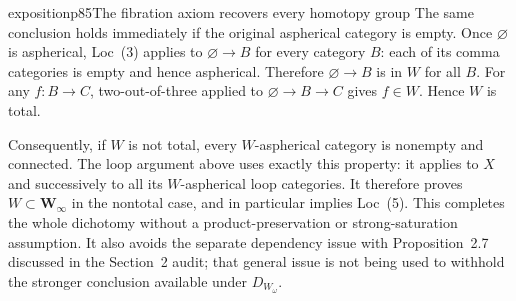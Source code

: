 \begin{dcomment}{exposition}{p85}{The fibration axiom recovers every homotopy group}
The same conclusion holds immediately if the original aspherical category is empty. Once $\varnothing$ is aspherical, Loc~(3) applies to $\varnothing\to B$ for every category $B$: each of its comma categories is empty and hence aspherical. Therefore $\varnothing\to B$ is in $W$ for all $B$. For any $f:B\to C$, two-out-of-three applied to $\varnothing\to B\to C$ gives $f\in W$. Hence $W$ is total.

Consequently, if $W$ is not total, every $W$-aspherical category is nonempty and connected. The loop argument above uses exactly this property: it applies to $X$ and successively to all its $W$-aspherical loop categories. It therefore proves $W\subset\mathbf W_\infty$ in the nontotal case, and in particular implies Loc~(5). This completes the whole dichotomy without a product-preservation or strong-saturation assumption. It also avoids the separate dependency issue with Proposition~2.7 discussed in the Section~2 audit; that general issue is not being used to withhold the stronger conclusion available under $D_{W_\omega}$.
\end{dcomment}


